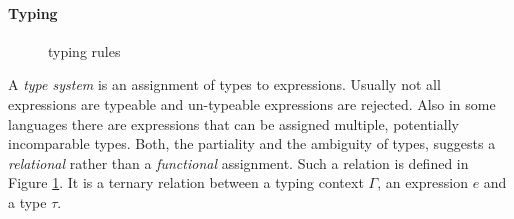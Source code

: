 {%
\paragraph{Typing}

\begin{figure}[t]
  \centering
  \caption{\stlcbool typing rules}
  \label{fig:intro:stlcbooltyping}
\end{figure}

A \emph{type system} is an assignment of types to expressions. Usually not all
expressions are typeable and un-typeable expressions are rejected. Also in some
languages there are expressions that can be assigned multiple, potentially
incomparable types. Both, the partiality and the ambiguity of types, suggests a
\emph{relational} rather than a \emph{functional} assignment. Such a relation is
defined in Figure \ref{fig:intro:stlcbooltyping}. It is a ternary relation
 between a typing context $\Gamma$,
an expression $e$ and a type $\tau$.

}
